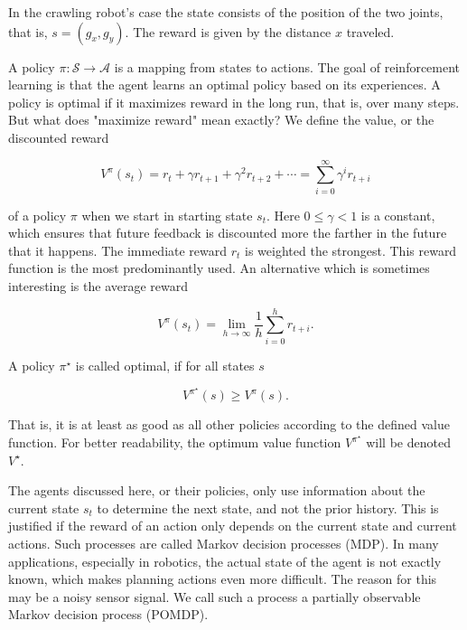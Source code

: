 \documentclass[10pt]{book}
\begin{document}
In the crawling robot's case the state consists of the position of the two joints, that is, $s=\left(g_{x}, g_{y}\right)$. The reward is given by the distance $x$ traveled.

A policy $\pi: \mathcal{S} \rightarrow \mathcal{A}$ is a mapping from states to actions. The goal of reinforcement learning is that the agent learns an optimal policy based on its experiences. A policy is optimal if it maximizes reward in the long run, that is, over many steps. But what does "maximize reward" mean exactly? We define the value, or the discounted reward


\begin{equation*}
V^{\pi}\left(s_{t}\right)=r_{t}+\gamma r_{t+1}+\gamma^{2} r_{t+2}+\cdots=\sum_{i=0}^{\infty} \gamma^{i} r_{t+i} \tag{10.1}
\end{equation*}


of a policy $\pi$ when we start in starting state $s_{t}$. Here $0 \leq \gamma<1$ is a constant, which ensures that future feedback is discounted more the farther in the future that it happens. The immediate reward $r_{t}$ is weighted the strongest. This reward function is the most predominantly used. An alternative which is sometimes interesting is the average reward


\begin{equation*}
V^{\pi}\left(s_{t}\right)=\lim _{h \rightarrow \infty} \frac{1}{h} \sum_{i=0}^{h} r_{t+i} . \tag{10.2}
\end{equation*}


A policy $\pi^{\star}$ is called optimal, if for all states $s$


\begin{equation*}
V^{\pi^{\star}}(s) \geq V^{\pi}(s) . \tag{10.3}
\end{equation*}


That is, it is at least as good as all other policies according to the defined value function. For better readability, the optimum value function $V^{\pi^{\star}}$ will be denoted $V^{\star}$.

The agents discussed here, or their policies, only use information about the current state $s_{t}$ to determine the next state, and not the prior history. This is justified if the reward of an action only depends on the current state and current actions. Such processes are called Markov decision processes (MDP). In many applications, especially in robotics, the actual state of the agent is not exactly known, which makes planning actions even more difficult. The reason for this may be a noisy sensor signal. We call such a process a partially observable Markov decision process (POMDP).
\end{document}
